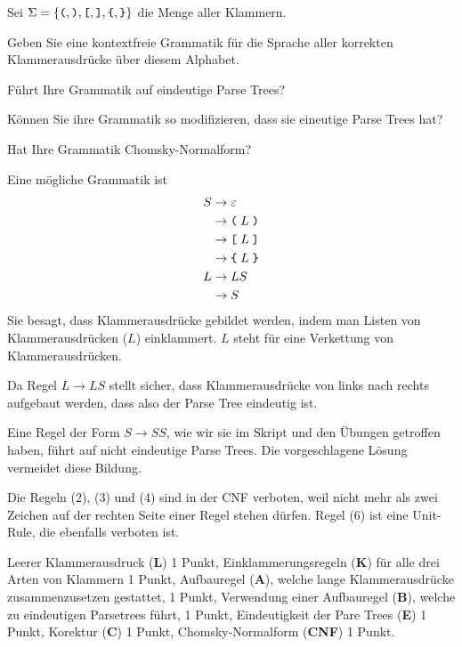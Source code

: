 Sei $\Sigma=\{
\texttt{(},
\texttt{)},
\texttt{[},
\texttt{]},
\verb+{+,
\verb+}+
\}$
die Menge aller Klammern.
\begin{teilaufgaben}
\item
Geben Sie eine kontextfreie Grammatik für die Sprache aller korrekten
Klammerausdrücke über diesem Alphabet.
\item
Führt Ihre Grammatik auf eindeutige Parse Trees?
\item
Können Sie ihre Grammatik so modifizieren, dass sie eineutige Parse Trees hat?
\item
Hat Ihre Grammatik Chomsky-Normalform?
\end{teilaufgaben}


\begin{loesung}
\begin{teilaufgaben}
\item
Eine mögliche Grammatik ist
\begin{align}
S&\rightarrow \varepsilon 
\\
 &\rightarrow \texttt{(} \; L \; \texttt{)}
\\
 &\rightarrow \texttt{[} \; L \; \texttt{]}
\\
 &\rightarrow \texttt{\char`\{} \; L \; \texttt{\char`\}}
\\
L&\rightarrow LS
\\
 &\rightarrow S
\end{align}
Sie besagt, dass Klammerausdrücke gebildet werden, indem man Listen
von Klammerausdrücken ($L$) einklammert.
$L$ steht für eine Verkettung von Klammerausdrücken.
\item
Da Regel $L\rightarrow LS$ stellt sicher, dass Klammerausdrücke von links
nach rechts aufgebaut werden, dass also der Parse Tree eindeutig ist.
\item
Eine Regel der Form $S\rightarrow SS$, wie wir sie im Skript und den
Übungen getroffen haben, führt auf nicht eindeutige Parse Trees.
Die vorgeschlagene Lösung vermeidet diese Bildung.
\item
Die Regeln 
(2), (3) und (4) sind in der CNF verboten, weil nicht mehr als zwei
Zeichen auf der rechten Seite einer Regel stehen dürfen.
Regel (6) ist eine Unit-Rule, die ebenfalls verboten ist.
\qedhere
\end{teilaufgaben}
\end{loesung}

\begin{bewertung}
Leerer Klammerausdruck ({\bf L}) 1 Punkt,
Einklammerungsregeln ({\bf K}) für alle drei Arten von Klammern 1 Punkt,
Aufbauregel ({\bf A}), welche lange Klammerausdrücke zusammenzusetzen
gestattet, 1 Punkt,
Verwendung einer Aufbauregel ({\bf B}), welche zu eindeutigen Parsetrees führt,
1 Punkt,
Eindeutigkeit der Pare Trees ({\bf E}) 1 Punkt,
Korektur ({\bf C}) 1 Punkt,
Chomsky-Normalform ({\bf CNF}) 1 Punkt.
\end{bewertung}


